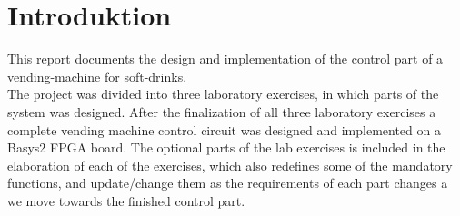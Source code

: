 \chapter{Introduktion}

This report documents the design and implementation of the control part of a vending-machine for soft-drinks. \\

The project was divided into three laboratory exercises, in which parts of the system was designed. After the finalization of all three laboratory exercises a complete vending machine control circuit was designed and implemented on a Basys2 FPGA board. The optional parts of the lab exercises is included in the elaboration of each of the exercises, which also redefines some of the mandatory functions, and update/change them as the requirements of each part changes a we move towards the finished control part. \\